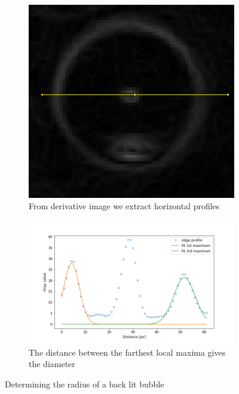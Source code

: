 			\begin{figure}
				\centering

				\begin{subfigure}[t]{.5\textwidth}
					\centering
					\includegraphics[scale=0.3]{images/green_edges.png}
					\caption{From derivative image we extract horizontal profiles}
				\end{subfigure}
								
				\begin{subfigure}[t]{.5\textwidth}
					\centering
					\includegraphics[scale=.6]{graphs/green_radius_demo.png}
					\caption{The distance between the farthest local maxima gives the diameter}
				\end{subfigure}
				
				\caption{Determining the radius of a back lit bubble}								
				\label{fig:green_radius}
			\end{figure}
			
